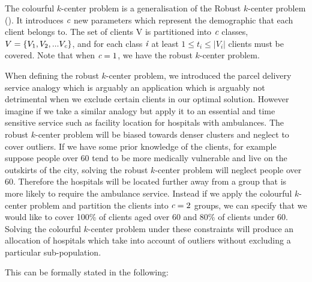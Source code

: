 The colourful $k$-center problem is a generalisation of the Robust $k$-center problem (\cite{bandyapadhyay_constant_2019}). It introduces $\emph{c}$ new parameters which represent the demographic that each client belongs to. The set of clients V is partitioned into $\emph{c}$ classes, $V=\{V_1, V_2, ... V_{\emph{c}}\}$, and for each class $\emph{i}$ at least $1\leq t_i \leq |V_i|$ clients must be covered. Note that when $\emph{c}=1$, we have the robust $k$-center problem.

When defining the robust $k$-center problem, we introduced the parcel delivery service analogy which is arguably an application which is arguably not detrimental when we exclude certain clients in our optimal solution. However imagine if we take a similar analogy but apply it to an essential and time sensitive service such as facility location for hospitals with ambulances. The robust $k$-center problem will be biased towards denser clusters and neglect to cover outliers. If we have some prior knowledge of the clients, for example suppose people over 60 tend to be more medically vulnerable and live on the outskirts of the city, solving the robust $k$-center problem will neglect people over 60. Therefore the hospitals will be located further away from a group that is more likely to require the ambulance service. Instead if we apply the colourful $k$-center problem and partition the clients into $\emph{c}=2$ groups, we can specify that we would like to cover 100\% of clients aged over 60 and 80\% of clients under 60. Solving the colourful $k$-center problem under these constraints will produce an allocation of hospitals which take into account of outliers without excluding a particular sub-population.

This can be formally stated in the following:


